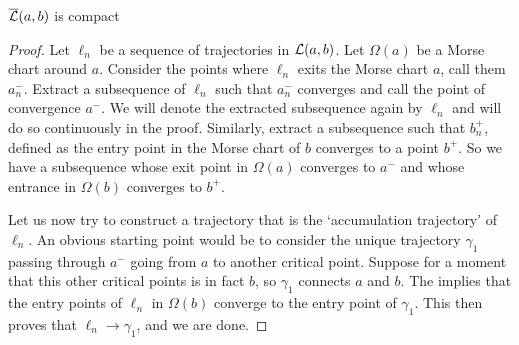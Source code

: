 \begin{theorem}
    $\overline{\mathcal L}(a, b)$ is compact
\end{theorem}
\begin{proof}
    Let $ \ell_n$ be a sequence of trajectories in $\mathcal L(a, b)$.
    Let $\Omega(a)$ be a Morse chart around $a$.
    Consider the points where $\ell_n$ exits the Morse chart $a$, call them $a_n^{-}$.
    Extract a subsequence of $\ell_n$ such that $a_{n}^{-}$ converges and call the point of convergence $a^{-}$.
    We will denote the extracted subsequence again by $\ell_n$ and will do so continuously in the proof.
    Similarly, extract a subsequence such that $b_n^{+}$, defined as the entry point in the Morse chart of $b$ converges to a point $b^{+}$.
    So we have a subsequence whose exit point in $\Omega(a)$  converges to $a^{-}$ and whose entrance in $\Omega(b)$ converges to  $b^{+}$.

    Let us now try to construct a trajectory that is the `accumulation trajectory' of $\ell_n$.
    An obvious starting point would be to consider the unique trajectory $\gamma_1$ passing through $a^{-}$ going from $a$ to another critical point.
    Suppose for a moment that this other critical points is in fact $b$, so $\gamma_1$ connects  $a$ and  $b$.
    The  implies that the entry points of $\ell_n$ in $\Omega(b)$ converge to the entry point of $\gamma_1$. This then proves that $\ell_n \to  \gamma_1$, and we are done.


\end{proof}
